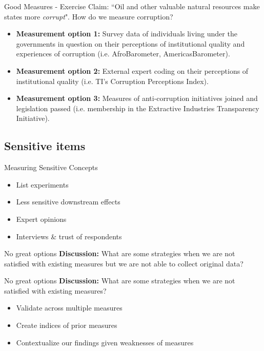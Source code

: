 \documentclass{beamer}
\begin{document}
\begin{frame}{Good Measures - Exercise}
Claim: ``Oil and other valuable natural resources make states more \textit{corrupt}". How do we measure corruption? 
\begin{itemize} 
\item \textbf{Measurement option 1:} Survey data of individuals living under the governments in question on their perceptions of institutional quality and experiences of corruption (i.e. AfroBarometer, AmericasBarometer). 
\item \textbf{Measurement option 2:} External expert coding on their perceptions of institutional quality (i.e. TI's Corruption Perceptions Index).
\item \textbf{Measurement option 3:} Measures of anti-corruption initiatives joined and legislation passed (i.e. membership in the Extractive Industries Transparency Initiative). 
\end{itemize} 
\end{frame}
\subsection{Sensitive items} 
\begin{frame}{Measuring Sensitive Concepts}
\begin{itemize}
    \item List experiments 
    \item Less sensitive downstream effects
    \item Expert opinions 
    \item Interviews \& trust of respondents 
\end{itemize}
\end{frame}

\begin{frame}{No great options}
\textbf{Discussion:} What are some strategies when we are not satisfied with existing measures but we are not able to collect original data? 
\end{frame} 

\begin{frame}{No great options}
\textbf{Discussion:} What are some strategies when we are not satisfied with existing measures? 
\begin{itemize}
    \item Validate across multiple measures
    \item Create indices of prior measures
    \item Contextualize our findings given weaknesses of measures 
\end{itemize}
\end{frame} 
\end{document}
